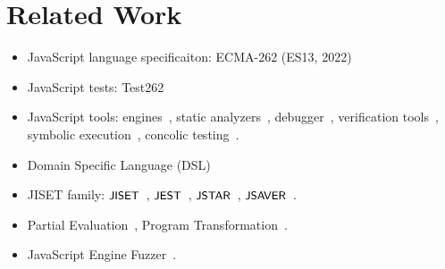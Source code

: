 \section{Related Work}\label{sec:related}

\begin{itemize}
  \item JavaScript language specificaiton: ECMA-262 (ES13, 2022)~\cite{es13}
  \item JavaScript tests: Test262~\cite{test262}
  \item JavaScript tools: engines~\cite{v8, jscore, graaljs, chakra,
    spidermonkey, xs}, static analyzers~\cite{safe, safe2, tajs, wala, jsai},
    debugger~\cite{jsexplain}, verification tools~\cite{javert, javert2,
    ad-safety, javanni}, symbolic execution~\cite{symbolic-js, sym-js, expo-se},
    concolic testing~\cite{jalangi, type-conc-test}.
  \item Domain Specific Language (DSL)~\cite{dsl-survey, dsl-survey2}
  \item JISET family: $\textsf{\small JISET}$~\cite{jiset}, $\textsf{\small JEST}$~\cite{jest},
    $\textsf{\small JSTAR}$~\cite{jstar}, $\textsf{\small JSAVER}$~\cite{jsaver}.
  \item Partial Evaluation~\cite{peval, peval-survey}, Program
    Transformation~\cite{trans-ai}.
  \item JavaScript Engine Fuzzer~\cite{montage, langfuzz, die, favocado,
    codealchemist, sofi, comfort, superion, fuzzilli, jsfunfuzz,
  ifuzzer}.
\end{itemize}

\todo
